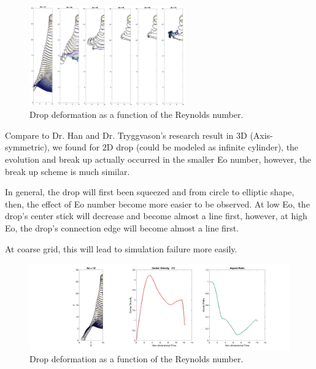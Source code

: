 \documentclass[12pt]{article}
\begin{document}
\subsubsection{}
\begin{figure}[H]
    \centering
    \includegraphics[width=0.6\textwidth]{Latex/figures/Eo_effect.jpg}
    \caption{Drop deformation as a function of the Reynolds number.}
    \label{deformation}
\end{figure}



Compare to Dr. Han and Dr. Tryggvason's research result in 3D (Axis-symmetric), we found for 2D drop (could be modeled as infinite cylinder), the evolution and break up actually occurred in the smaller Eo number, however, the break up scheme is much similar.




In general, the drop will first been squeezed and from circle to elliptic shape, then, the effect of Eo number become more easier to be observed. At low Eo, the drop's center stick will decrease and become almost a line first, however, at high Eo, the drop's connection edge will become almost a line first. 

At coarse grid, this will lead to simulation failure more easily. 




\begin{figure}[H]
    \centering
    \includegraphics[width=\textwidth]{Latex/figures/All_Eo=12__t=0.28.png}
    \caption{Drop deformation as a function of the Reynolds number.}
    \label{deformation}
\end{figure}
\end{document}
